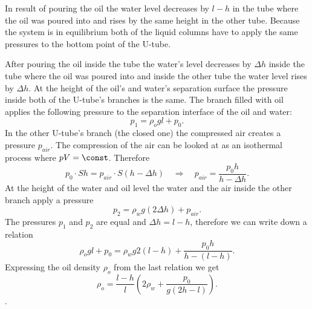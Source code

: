 {\ifEngHint
In result of pouring the oil the water level decreases by $l - h$ in the tube where the oil was poured into and rises by the same height in the other tube. Because the system is in equilibrium both of the liquid columns have to apply the same pressures to the bottom point of the U-tube.
\fi


\ifEngSolution
After pouring the oil inside the tube the water’s level decreases by $\Delta h$ inside the tube where the oil was poured into and inside the other tube the water level rises by $\Delta h$. At the height of the oil’s and water’s separation surface the pressure inside both of the U-tube’s branches is the same. The branch filled with oil applies the following pressure to the separation interface of the oil and water:
\[ p_1 = \rho_{o}gl + p_0.\]
In the other U-tube’s branch (the closed one) the compressed air creates a pressure $p_{air}$. The compression of the air can be looked at as an isothermal process where $pV = \const$. Therefore
\[ p_0\cdot Sh = p_{air}\cdot S(h-\Delta h) \quad\Rightarrow\quad p_{air} = \frac{p_0h}{h-\Delta h}.\]
At the height of the water and oil level the water and the air inside the other branch apply a pressure
\[ p_2 = \rho_wg(2\Delta h) + p_{air}.\]
The pressures $p_1$ and $p_2$ are equal and $\Delta h = l - h$, therefore we can write down a relation
\[ \rho_{o}gl + p_0 = \rho_wg2(l-h) + \frac{p_0h}{h-(l-h)}.\]
Expressing the oil density $\rho_{o}$ from the last relation we get
\[ \rho_{o} = \frac{l-h}{l}\left(2\rho_w+\frac{p_0}{g(2h-l)}\right).\].
\fi
}
